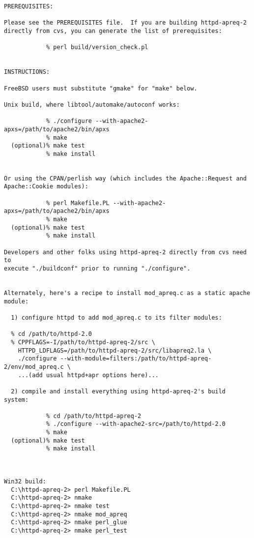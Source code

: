  

\footnotesize\begin{verbatim}PREREQUISITES:

Please see the PREREQUISITES file.  If you are building httpd-apreq-2 
directly from cvs, you can generate the list of prerequisites:

            % perl build/version_check.pl


INSTRUCTIONS:

FreeBSD users must substitute "gmake" for "make" below.

Unix build, where libtool/automake/autoconf works:

            % ./configure --with-apache2-apxs=/path/to/apache2/bin/apxs
            % make
  (optional)% make test
            % make install


Or using the CPAN/perlish way (which includes the Apache::Request and
Apache::Cookie modules):

            % perl Makefile.PL --with-apache2-apxs=/path/to/apache2/bin/apxs
            % make
  (optional)% make test
            % make install

Developers and other folks using httpd-apreq-2 directly from cvs need to
execute "./buildconf" prior to running "./configure".


Alternately, here's a recipe to install mod_apreq.c as a static apache module:

  1) configure httpd to add mod_apreq.c to its filter modules:

  % cd /path/to/httpd-2.0
  % CPPFLAGS=-I/path/to/httpd-apreq-2/src \
    HTTPD_LDFLAGS=/path/to/httpd-apreq-2/src/libapreq2.la \
    ./configure --with-module=filters:/path/to/httpd-apreq-2/env/mod_apreq.c \
    ...(add usual httpd+apr options here)...

  2) compile and install everything using httpd-apreq-2's build system:

            % cd /path/to/httpd-apreq-2
            % ./configure --with-apache2-src=/path/to/httpd-2.0
            % make
  (optional)% make test
            % make install



Win32 build:
  C:\httpd-apreq-2> perl Makefile.PL
  C:\httpd-apreq-2> nmake
  C:\httpd-apreq-2> nmake test
  C:\httpd-apreq-2> nmake mod_apreq
  C:\httpd-apreq-2> nmake perl_glue
  C:\httpd-apreq-2> nmake perl_test




\end{verbatim}\normalsize 


